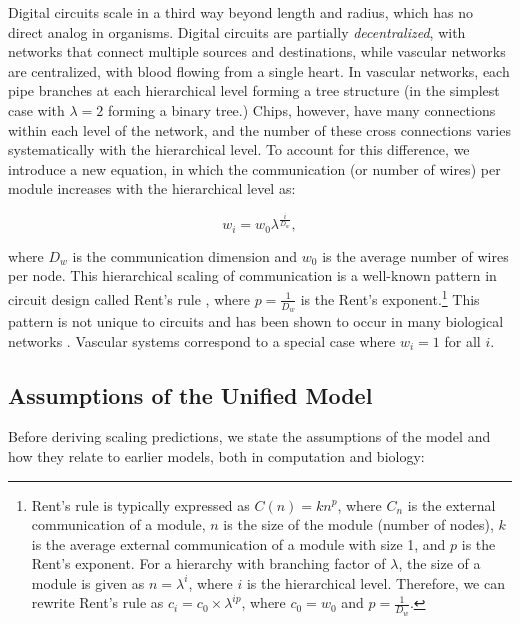 \documentclass[12pt]{article}
\begin{document}
Digital circuits scale in a third way beyond length and radius, which
has no direct analog in organisms. Digital circuits are partially \emph{decentralized}, with networks that connect multiple sources and destinations, while vascular networks are
centralized, with blood flowing from a single heart. 
In vascular networks, each pipe
branches at each hierarchical level forming a tree structure
(in the simplest case with $\lambda = 2$ forming
a binary tree.) Chips, however, have many connections within each
level of the network, and the number of these cross connections
varies systematically with the hierarchical level.  
 To account for
this difference, we introduce a new equation, in which the
communication (or number of wires) per module increases with the
hierarchical level as:  

\begin{equation}
  w_i = w_0 \lambda^{\frac{i}{D_w}},
\label{eq:communication}
\end{equation}

\noindent where $D_w$ is the communication dimension and $w_0$ is the average
number of wires per node.  This hierarchical scaling of communication is a
well-known pattern in circuit design called Rent's rule \cite{christie00},
where $p = \frac{1}{D_w}$ is the Rent's exponent.\footnote{Rent's rule is typically
  expressed as $C(n) = kn^p$, where $C_n$ is the external communication of a
  module, $n$ is the size of the module (number of nodes), $k$ is the average
  external communication of a module with size 1, and $p$ is the Rent's
  exponent. For a hierarchy with branching factor of $\lambda$, the size of a
  module is given as $n = \lambda^i$, where $i$ is the hierarchical level.
  Therefore, we can rewrite Rent's rule as $c_i = c_0 \times \lambda^{ip}$,
where $c_0 = w_0$ and $p = \frac{1}{D_w}$.} This pattern is not unique to circuits
and has been shown to occur in many biological networks
\cite{reda09,bassett10,meunier2010modular,solee2013evolutionary}.   Vascular systems correspond to a special case where 
$w_i = 1$ for all $i$. 

\subsection{Assumptions of the Unified Model}
\label{sec:assumptions}

Before deriving scaling predictions, we state the
assumptions of the model and how they relate to earlier models, both in
computation and biology:
\end{document}
